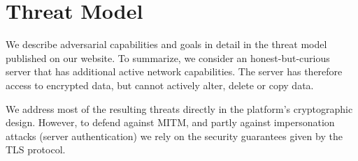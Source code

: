 \section{Threat Model}
\label{sec:threat_model}

We describe adversarial capabilities and goals in detail in the threat model published on our website. %
To summarize, we consider an honest-but-curious server that has additional active network capabilities.
The server has therefore access to encrypted data, but cannot actively alter, delete or copy data.

We address most of the resulting threats directly in the platform's cryptographic design.
However, to defend against \ac{MITM}, and partly against impersonation attacks (server authentication) we rely on the security guarantees given by the \ac{TLS} protocol.
